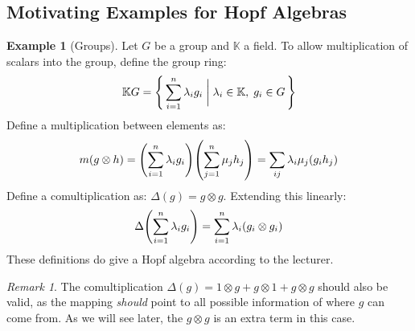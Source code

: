 \documentclass{article}
\theoremstyle{definition}
\newtheorem{Example}{Example}
\theoremstyle{remark}
\newtheorem*{Remark*}{Remark}
\begin{document}
\subsection{Motivating Examples for Hopf Algebras}
\begin{Example}[Groups]
Let $G$ be a group and $\mathbb{K}$ a field. To allow multiplication of scalars into the group, define the group ring:
$$\mathbb KG = \qty{\, \sum_{i = 1}^{n}\lambda_i g_i \biggm| \lambda_i \in \mathbb{K},\; g_i \in G \,} $$
Define a multiplication between elements as:
$$ m(g \otimes h) = \pqty{\sum_{i = 1}^{n}\lambda_i g_i}\pqty{\sum_{j = 1}^{n}\mu_j h_j} = \sum_{ij}  \lambda_i \mu_j(g_i h_j) $$
Define a comultiplication as: $ \Delta(g) = g \otimes g $. Extending this linearly:
$$ \Delta\pqty{\sum_{i = 1}^n \lambda_ig_i} = \sum_{i = 1}^n \lambda_i(g_i \otimes g_i)$$
These definitions do give a Hopf algebra according to the lecturer.
\end{Example}

\begin{Remark*}
The comultiplication $ \Delta(g) = 1 \otimes g + g \otimes 1 + g \otimes g$ should also be valid, as the mapping \emph{should} point to all possible information of where $g$ can come from. As we will see later, the $ g \otimes g $ is an extra term in this case.
\end{Remark*}
\end{document}
